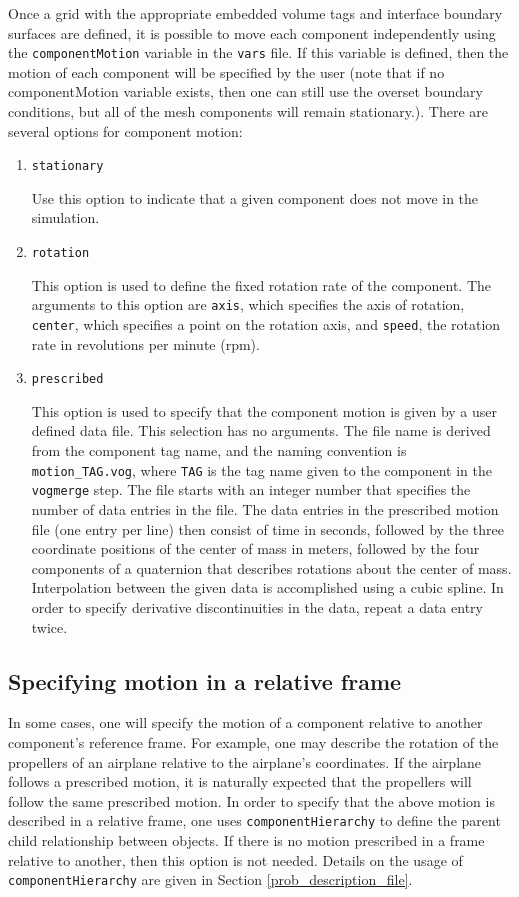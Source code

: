 \documentclass{article}
\begin{document}
Once a grid with the appropriate embedded volume tags and interface
boundary surfaces are defined, it is possible to move each component
independently using the {\tt componentMotion} variable in the {\tt vars}
file.  If this variable is defined, then the motion of each component will be specified by the user (note that if no componentMotion variable exists, then one can still use the overset boundary conditions, but all of the mesh components will remain stationary.).  There are several options for component motion:
\begin{enumerate}
\item {\tt stationary} 

Use this option to indicate that a given component does not move in
the simulation.
\item {\tt rotation}

This option is used to define the fixed rotation rate of the component.
The arguments to this option are {\tt axis},
which specifies the axis of rotation, {\tt center}, which specifies a
point on the rotation axis, and {\tt speed}, the rotation rate in
revolutions per minute (rpm).

\item {\tt prescribed}

This option is used to specify that the component motion is
given by a user defined data file.  This selection has no
arguments.  The file name is derived from the component tag name,
and the naming convention is {\tt motion\_TAG.vog}, where {\tt TAG} is
the tag name given to the component in the {\tt
  vogmerge} step.  The file starts with an integer number that specifies
the number of data entries in the file.
The data entries in the prescribed motion file (one entry per line) then
consist of time in seconds, followed by the three coordinate
positions of the center of mass in meters, followed by the four
components of a quaternion that describes rotations about the center
of mass.  Interpolation between the given data is accomplished using a cubic
spline.  In order to specify derivative discontinuities in the data,
repeat a data entry twice.

\end{enumerate}

\subsection{Specifying motion in a relative frame}

In some cases, one will specify the motion of a component relative to
another component's reference frame.  For example, one may describe the
rotation of the propellers of an airplane relative to the airplane's
coordinates.  If the airplane follows a prescribed motion, it is
naturally expected that the propellers will follow the same prescribed
motion.  In order to specify that the above motion is described in a
relative frame, one uses {\tt componentHierarchy} to define the
parent child relationship between objects.  If there is no motion
prescribed in a frame relative to another, then this option is not
needed.  Details on the usage of {\tt componentHierarchy} are given in
Section \ref{prob_description_file}.
\end{document}
